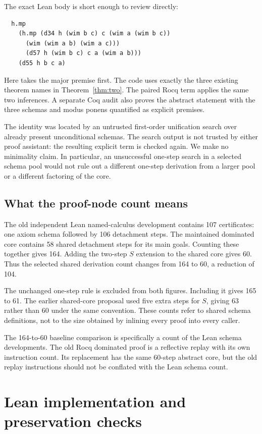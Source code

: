 \documentclass[11pt,letterpaper]{article}
\newcommand{\code}[1]{\texttt{\small\detokenize{#1}}}
\begin{document}
The exact Lean body is short enough to review directly:
\begin{lstlisting}
  h.mp
    (h.mp (d34 h (wim b c) c (wim a (wim b c))
      (wim (wim a b) (wim a c)))
      (d57 h (wim b c) c a (wim a b)))
    (d55 h b c a)
\end{lstlisting}
Here \code{h.mp} takes the major premise first. The code uses exactly the three
existing theorem names in Theorem~\ref{thm:two}. The paired Rocq term applies the
same two inferences. A separate Coq audit also proves the abstract statement
with the three schemas and modus ponens quantified as explicit premises.

The identity was located by an untrusted first-order unification search over
already present unconditional schemas. The search output is not trusted by
either proof assistant: the resulting explicit term is checked again. We make
no minimality claim. In particular, an unsuccessful one-step search in a
selected schema pool would not rule out a different one-step derivation from
a larger pool or a different factoring of the core.

\subsection{What the proof-node count means}

The old independent Lean named-calculus development contains 107 certificates: one
axiom schema followed by 106 detachment steps. The maintained dominated core
contains 58 shared detachment steps for its main goals. Counting these together
gives 164. Adding the two-step $S$ extension to the shared core gives 60. Thus
the selected shared derivation count changes from 164 to 60, a reduction of 104.

The unchanged one-step \code{lift_right} rule is excluded from both figures.
Including it gives 165 to 61. The earlier shared-core proposal used five extra
steps for $S$, giving 63 rather than 60 under the same convention. These counts
refer to shared schema definitions, not to the size obtained by inlining every
proof into every caller.

The 164-to-60 baseline comparison is specifically a count of the Lean schema
developments. The old Rocq dominated proof is a reflective replay with its own
instruction count. Its replacement has the same 60-step abstract core, but the
old replay instructions should not be conflated with the Lean schema count.

\section{Lean implementation and preservation checks}
\end{document}
